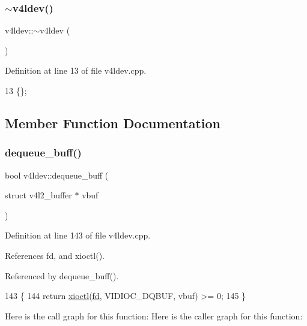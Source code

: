 \subsubsection{\texorpdfstring{$\sim$v4ldev()}{~v4ldev()}}
{\footnotesize\ttfamily v4ldev\+::$\sim$v4ldev (\begin{DoxyParamCaption}{ }\end{DoxyParamCaption})}



Definition at line 13 of file v4ldev.\+cpp.


\begin{DoxyCode}
13 \{\};
\end{DoxyCode}


\subsection{Member Function Documentation}
\mbox{\label{classv4ldev_a539e3edba551564e19bd1ae21c0cdb26}} 
\subsubsection{\texorpdfstring{dequeue\+\_\+buff()}{dequeue\_buff()}\hspace{0.1cm}{\footnotesize\ttfamily [1/2]}}
{\footnotesize\ttfamily bool v4ldev\+::dequeue\+\_\+buff (\begin{DoxyParamCaption}\item[{struct v4l2\+\_\+buffer $\ast$}]{vbuf }\end{DoxyParamCaption})}



Definition at line 143 of file v4ldev.\+cpp.



References fd, and xioctl().



Referenced by dequeue\+\_\+buff().


\begin{DoxyCode}
143                                                    \{
144     \textcolor{keywordflow}{return} \hyperlink{classv4ldev_ab93cb1ab18254ca362310b006bd2552d}{xioctl}(\hyperlink{classv4ldev_a2cd44be3be75a19ab8bec12b28e29142}{fd}, VIDIOC\_DQBUF, vbuf) >= 0;
145 \}
\end{DoxyCode}
Here is the call graph for this function\+:
Here is the caller graph for this function\+:
\mbox{\label{classv4ldev_a699e44c1d314c6a77ad9afc4b6a89078}} 

